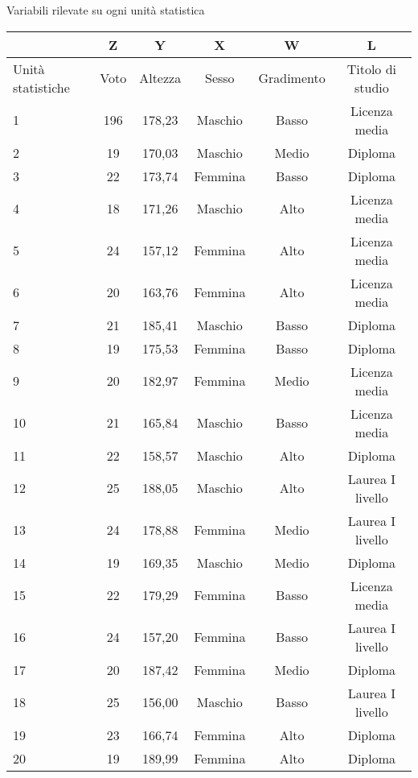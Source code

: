 \begin{center}
        Variabili rilevate su ogni unità statistica
\end{center}
\begin{tabular}{|p{1.5cm}|c|c|c|c|c|}
\hline
        &Z&     Y       &X      &W      &L\\
        \hline
Unità statistiche &     Voto&   Altezza &Sesso& Gradimento&     Titolo di 
studio\\
\hline
        1&      196&    178,23  &Maschio&       Basso&  Licenza media\\
        \hline
        2&      19&     170,03& Maschio &Medio& Diploma\\
        \hline
        3&      22      &173,74 &Femmina&       Basso&  Diploma\\
        \hline
        4       &18&    171,26& Maschio&        Alto&   Licenza media\\
        \hline
        5&      24&     157,12& Femmina&        Alto&   Licenza media\\
        \hline
        6&      20      &163,76&        Femmina &Alto&  Licenza media\\
        \hline
        7&      21&     185,41& Maschio &Basso  &Diploma\\
        \hline
        8       &19&    175,53& Femmina&        Basso   &Diploma\\
        \hline
        9&      20&     182,97& Femmina&        Medio&  Licenza media\\
        \hline
        10&     21      &165,84&        Maschio&        Basso   &Licenza 
media\\
        \hline
        11      &22     &158,57 &Maschio&       Alto    &Diploma\\
        \hline
        12      &25     &188,05&        Maschio&        Alto&   Laurea I 
livello\\
        \hline
        13      &24&    178,88& Femmina&        Medio&  Laurea I livello\\
        \hline
        14      &19&    169,35& Maschio&        Medio&  Diploma\\
        \hline
        15      &22&    179,29& Femmina&        Basso&  Licenza media\\
        \hline
        16&     24      &157,20 &Femmina&       Basso&  Laurea I livello\\
        \hline
        17&     20      &187,42&        Femmina&        Medio&  Diploma\\
        \hline
        18      &25&    156,00& Maschio &Basso  &Laurea I livello\\
        \hline
        19&     23&     166,74& Femmina&        Alto&   Diploma\\
        \hline
        20&     19      &189,99&        Femmina &Alto&  Diploma\\
        \hline

\end{tabular}

